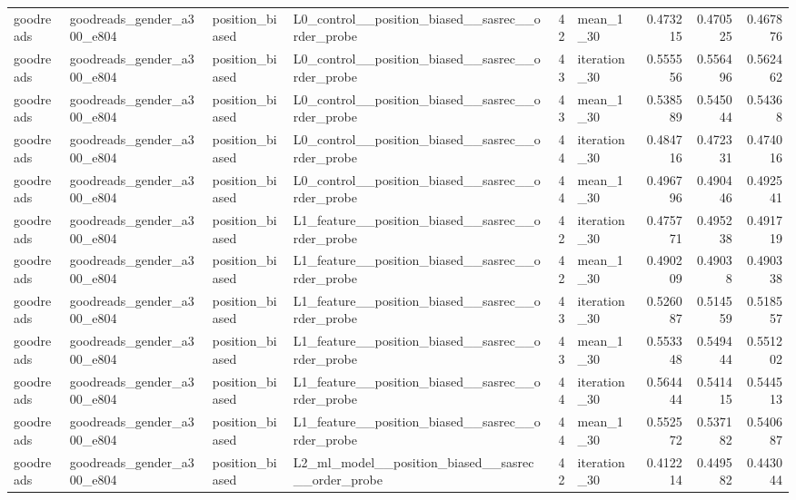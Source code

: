 \begin{table}[htbp!]
\begin{tabular}{llllrlrrr}
goodreads & goodreads\_gender\_a300\_e804 & position\_biased & L0\_control\_\_position\_biased\_\_sasrec\_\_order\_probe & 42 & mean\_1\_30 & 0.473215 & 0.470525 & 0.467876 \\
goodreads & goodreads\_gender\_a300\_e804 & position\_biased & L0\_control\_\_position\_biased\_\_sasrec\_\_order\_probe & 43 & iteration\_30 & 0.555556 & 0.556496 & 0.562462 \\
goodreads & goodreads\_gender\_a300\_e804 & position\_biased & L0\_control\_\_position\_biased\_\_sasrec\_\_order\_probe & 43 & mean\_1\_30 & 0.538589 & 0.545044 & 0.54368 \\
goodreads & goodreads\_gender\_a300\_e804 & position\_biased & L0\_control\_\_position\_biased\_\_sasrec\_\_order\_probe & 44 & iteration\_30 & 0.484716 & 0.472331 & 0.474016 \\
goodreads & goodreads\_gender\_a300\_e804 & position\_biased & L0\_control\_\_position\_biased\_\_sasrec\_\_order\_probe & 44 & mean\_1\_30 & 0.496796 & 0.490446 & 0.492541 \\
goodreads & goodreads\_gender\_a300\_e804 & position\_biased & L1\_feature\_\_position\_biased\_\_sasrec\_\_order\_probe & 42 & iteration\_30 & 0.475771 & 0.495238 & 0.491719 \\
goodreads & goodreads\_gender\_a300\_e804 & position\_biased & L1\_feature\_\_position\_biased\_\_sasrec\_\_order\_probe & 42 & mean\_1\_30 & 0.490209 & 0.49038 & 0.490338 \\
goodreads & goodreads\_gender\_a300\_e804 & position\_biased & L1\_feature\_\_position\_biased\_\_sasrec\_\_order\_probe & 43 & iteration\_30 & 0.526087 & 0.514559 & 0.518557 \\
goodreads & goodreads\_gender\_a300\_e804 & position\_biased & L1\_feature\_\_position\_biased\_\_sasrec\_\_order\_probe & 43 & mean\_1\_30 & 0.553348 & 0.549444 & 0.551202 \\
goodreads & goodreads\_gender\_a300\_e804 & position\_biased & L1\_feature\_\_position\_biased\_\_sasrec\_\_order\_probe & 44 & iteration\_30 & 0.564444 & 0.541415 & 0.544513 \\
goodreads & goodreads\_gender\_a300\_e804 & position\_biased & L1\_feature\_\_position\_biased\_\_sasrec\_\_order\_probe & 44 & mean\_1\_30 & 0.552572 & 0.537182 & 0.540687 \\
goodreads & goodreads\_gender\_a300\_e804 & position\_biased & L2\_ml\_model\_\_position\_biased\_\_sasrec\_\_order\_probe & 42 & iteration\_30 & 0.412214 & 0.449582 & 0.443044 \\

\end{tabular}
\end{table}
